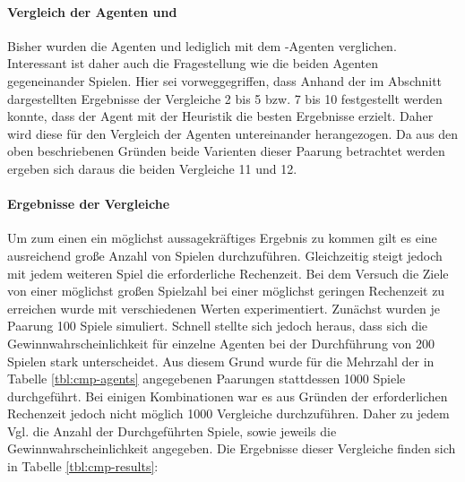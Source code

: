 \paragraph{Vergleich der Agenten  und }
Bisher wurden die Agenten  und  lediglich mit dem -Agenten verglichen. Interessant ist daher auch die Fragestellung wie die beiden Agenten gegeneinander Spielen. Hier sei vorweggegriffen, dass Anhand der im Abschnitt  dargestellten Ergebnisse der Vergleiche 2 bis 5 bzw. 7 bis 10 festgestellt werden konnte, dass der Agent  mit der Heuristik  die besten Ergebnisse erzielt. Daher wird diese für den Vergleich der Agenten untereinander herangezogen. Da aus den oben beschriebenen Gründen beide Varienten dieser Paarung betrachtet werden ergeben sich daraus die beiden Vergleiche 11 und 12.

\paragraph{Ergebnisse der Vergleiche}
\label{p:vgl-result}
Um zum einen ein möglichst aussagekräftiges Ergebnis zu kommen gilt es eine ausreichend große Anzahl von Spielen durchzuführen. Gleichzeitig steigt jedoch mit jedem weiteren Spiel die erforderliche Rechenzeit. Bei dem Versuch die Ziele von einer möglichst großen Spielzahl bei einer möglichst geringen Rechenzeit zu erreichen wurde mit verschiedenen Werten experimentiert. Zunächst wurden je Paarung 100 Spiele simuliert. Schnell stellte sich jedoch heraus, dass sich die Gewinnwahrscheinlichkeit für einzelne Agenten bei der Durchführung von 200 Spielen stark unterscheidet. Aus diesem Grund wurde für die Mehrzahl der in Tabelle \ref{tbl:cmp-agents} angegebenen Paarungen stattdessen 1000 Spiele durchgeführt. Bei einigen Kombinationen war es aus Gründen der erforderlichen Rechenzeit jedoch nicht möglich 1000 Vergleiche durchzuführen. Daher zu jedem Vgl. die Anzahl der Durchgeführten Spiele, sowie jeweils die Gewinnwahrscheinlichkeit angegeben. Die Ergebnisse dieser Vergleiche finden sich in Tabelle \ref{tbl:cmp-results}:

